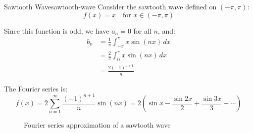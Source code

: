 \begin{example}{Sawtooth Wave}{sawtooth-wave}
    Consider the sawtooth wave defined on \((-\pi, \pi)\):
    \begin{equation}
        f(x) = x \quad \text{for } x \in (-\pi, \pi)
    \end{equation}

    Since this function is odd, we have \(a_n = 0\) for all \(n\), and:
    \begin{align}
        b_n & = \frac{1}{\pi} \int_{-\pi}^{\pi} x \sin(nx) \, dx \\
            & = \frac{2}{\pi} \int_{0}^{\pi} x \sin(nx) \, dx    \\
            & = \frac{2(-1)^{n+1}}{n}
    \end{align}

    The Fourier series is:
    \begin{equation}
        f(x) = 2 \sum_{n=1}^{\infty} \frac{(-1)^{n+1}}{n} \sin(nx) = 2\left(\sin x - \frac{\sin 2x}{2} + \frac{\sin 3x}{3} - \cdots\right)
    \end{equation}
\end{example}

\begin{figure}[H]
    \centering
    
    \caption{Fourier series approximation of a sawtooth wave}
    \label{fig:fourier-sawtooth}
\end{figure}

